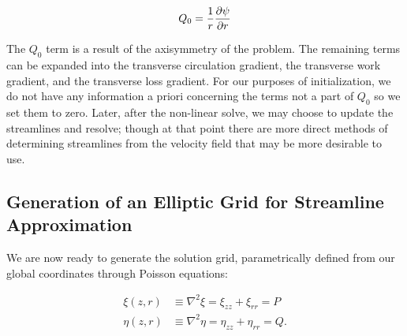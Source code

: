 \begin{equation}
    Q_0 = \frac{1}{r} \frac{\partial \psi}{\partial r}
\end{equation}

\noindent The \(Q_0\) term is a result of the axisymmetry of the problem.
%
The remaining terms can be expanded into the transverse circulation gradient, the transverse work gradient, and the transverse loss gradient.
%
For our purposes of initialization, we do not have any information a priori concerning the terms not a part of \(Q_0\) so we set them to zero.
%
Later, after the non-linear solve, we may choose to update the streamlines and resolve; though at that point there are more direct methods of determining streamlines from the velocity field that may be more desirable to use.

%



\subsection{Generation of an Elliptic Grid for Streamline Approximation}
\label{ssec:generateellipticgrid}

We are now ready to generate the solution grid, parametrically defined from our global coordinates through Poisson equations:

\begin{align}
    \label{eqn:poissonxi}
    \xi(z,r) &\equiv \nabla^2 \xi = \xi_{zz} + \xi_{rr} = P \\
    \label{eqn:poissoneta}
    \eta(z,r) &\equiv \nabla^2\eta = \eta_{zz} + \eta_{rr} = Q.
\end{align}


